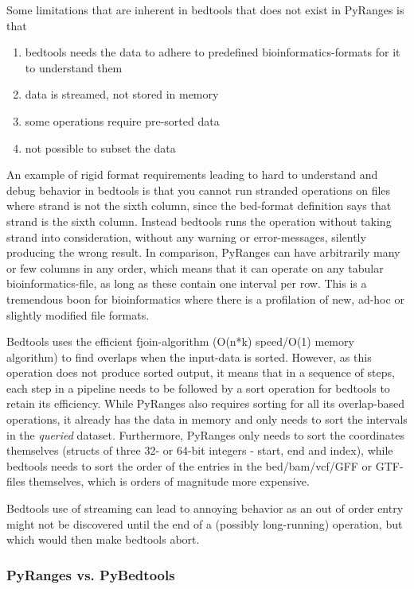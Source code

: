\documentclass[10pt,letterpaper]{article}
\begin{document}
Some limitations that are inherent in bedtools that does not exist in PyRanges
is that

\begin{enumerate}
  \item bedtools needs the data to adhere to predefined bioinformatics-formats
    for it to understand them
  \item data is streamed, not stored in memory
  \item some operations require pre-sorted data
  \item not possible to subset the data
\end{enumerate}

An example of rigid format requirements leading to hard to understand and debug
behavior in bedtools is that you cannot run stranded operations on files where
strand is not the sixth column, since the bed-format definition says that strand
is the sixth column. Instead bedtools runs the operation without taking strand
into consideration, without any warning or error-messages, silently producing
the wrong result. In comparison, PyRanges can have arbitrarily many or few
columns in any order, which means that it can operate on any tabular
bioinformatics-file, as long as these contain one interval per row. This is a
tremendous boon for bioinformatics where there is a profilation of new, ad-hoc
or slightly modified file formats.

Bedtools uses the efficient fjoin-algorithm (O(n*k) speed/O(1) memory algorithm)
to find overlaps when the input-data is sorted. However, as this operation does
not produce sorted output, it means that in a sequence of steps, each step in a
pipeline needs to be followed by a sort operation for bedtools to retain its
efficiency. While PyRanges also requires sorting for all its overlap-based
operations, it already has the data in memory and only needs to sort the
intervals in the \textit{queried} dataset. Furthermore, PyRanges only needs to
sort the coordinates themselves (structs of three 32- or 64-bit integers -
start, end and index), while bedtools needs to sort the order of the
entries in the bed/bam/vcf/GFF or GTF-files themselves, which is orders of
magnitude more expensive.

Bedtools use of streaming can lead to annoying behavior as an out of order entry
might not be discovered until the end of a (possibly long-running) operation,
but which would then make bedtools abort.

\subsubsection*{PyRanges vs. PyBedtools}
\end{document}
